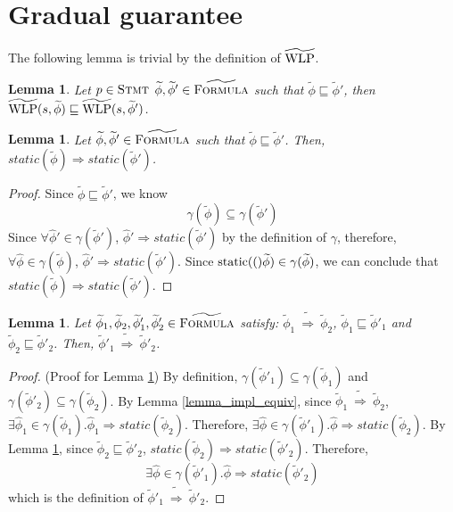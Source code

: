 \documentclass {article}
\newtheorem{lemma}[theorem]{Lemma}
\newcommand{\fphi}{\widehat{\phi}}
\newcommand{\tphi}{\widetilde{\phi}}
\newcommand{\imp}{\Rightarrow}
\newcommand{\timp}{\ \widetilde{\Rightarrow}\ }
\newcommand{\twlp}[2]{\widetilde{\textup{WLP}}(#1,#2)}
\newcommand{\static}[1]{\textup{static}(#1)}
\newcommand{\gradformula}{\widetilde{\textsc{Formula}}}
\begin{document}
\section{Gradual guarantee}
\label{section_guarantee}
The following lemma is trivial by the definition of $\widetilde{\textup{WLP}}$.
\begin{lemma}
\label{lemma_wlp_precision}
Let $p \in \textsc{Stmt}$ $\tphi, \tphi' \in \gradformula$ such that $\tphi \sqsubseteq \tphi'$, then $\twlp{s}{\tphi} \sqsubseteq \twlp{s}{\tphi'}$.
\end{lemma}
\begin{lemma}
\label{lemma_static_prec_implication}
Let $\tphi, \tphi' \in \gradformula$ such that $\tphi \sqsubseteq \tphi'$. Then, $static(\tphi) \imp static(\tphi')$.
\end{lemma}
\begin{proof} Since $\tphi \sqsubseteq \tphi'$, we know $$\gamma(\tphi) \subseteq \gamma(\tphi')$$ Since $\forall \fphi' \in \gamma(\tphi')$, $\fphi' \imp static(\tphi')$ by the definition of $\gamma$, therefore,  $\forall \fphi \in \gamma(\tphi)$, $\fphi' \imp static(\tphi')$. Since $\static(\tphi) \in \gamma(\tphi)$, we can conclude that $static(\tphi) \imp static(\tphi')$.

\end{proof}
\begin{lemma}
\label{lemma_precision_implication}
Let $\tphi_1, \tphi_2, \tphi'_1, \tphi'_2 \in \gradformula$ satisfy: $\tphi_1 \timp \tphi_2$, $\tphi_1 \sqsubseteq \tphi'_1$ and $\tphi_2 \sqsubseteq \tphi'_2$. Then, $\tphi'_1 \timp \tphi'_2$.
\end{lemma}
\begin{proof} (Proof for Lemma \ref{lemma_precision_implication})
By definition, $\gamma(\tphi'_1) \subseteq \gamma(\tphi_1)$ and $\gamma(\tphi'_2) \subseteq \gamma(\tphi_2)$. By Lemma \ref{lemma_impl_equiv}, since $\tphi_1 \timp \tphi_2$, $\exists \fphi_1 \in \gamma(\tphi_1). \fphi_1 \imp static(\tphi_2)$. Therefore, $\exists \fphi \in \gamma(\tphi'_1). \fphi \imp static(\tphi_2)$. By Lemma \ref{lemma_static_prec_implication}, since $\tphi_2 \sqsubseteq \tphi'_2$, $static(\tphi_2) \imp static(\tphi'_2)$. Therefore, $$\exists \fphi \in \gamma(\tphi'_1). \fphi \imp static(\tphi'_2)$$ which is the definition of $\tphi'_1 \timp \tphi'_2$.
\end{proof}
\end{document}
